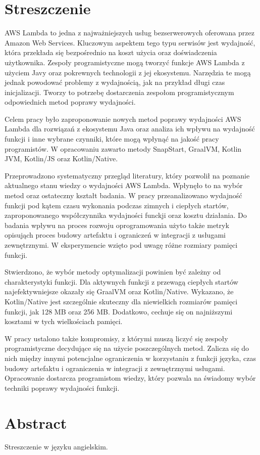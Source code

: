\section*{Streszczenie}

AWS Lambda to jedna z najważniejszych usług bezserwerowych oferowana przez Amazon Web Services.
Kluczowym aspektem tego typu serwisów jest wydajność, która przekłada się bezpośrednio na koszt użycia oraz doświadczenia użytkownika.
Zespoły programistyczne mogą tworzyć funkcje AWS Lambda z użyciem Javy oraz pokrewnych technologii z jej ekosystemu.
Narzędzia te mogą jednak powodować problemy z wydajnością, jak na przykład długi czas inicjalizacji.
Tworzy to potrzebę dostarczenia zespołom programistycznym odpowiednich metod poprawy wydajności.

Celem pracy było zaproponowanie nowych metod poprawy wydajności AWS Lambda dla rozwiązań z ekosystemu Java oraz analiza ich wpływu na wydajność funkcji i inne wybrane czynniki, które mogą wpłynąć na jakość pracy programistów.
W opracowaniu zawarto metody SnapStart, GraalVM, Kotlin JVM, Kotlin/JS oraz Kotlin/Native.

Przeprowadzono systematyczny przegląd literatury, który pozwolił na poznanie aktualnego stanu wiedzy o wydajności AWS Lambda.
Wpłynęło to na wybór metod oraz ostateczny kształt badania.
W pracy przeanalizowano wydajność funkcji pod kątem czasu wykonania podczas zimnych i ciepłych startów, zaproponowanego współczynnika wydajności funckji oraz kosztu działania.
Do badania wpływu na proces rozwoju oprogramowania użyto także metryk opisująch proces budowy artefaktu i ograniczeń w integracji z usługami zewnętrznymi.
W eksperymencie wzięto pod uwagę różne rozmiary pamięci funkcji.

Stwierdzono, że wybór metody optymalizacji powinien być zależny od charakterystyki funkcji.
Dla aktywnych funkcji z przewagą ciepłych startów najefektywniejsze okazały się GraalVM oraz Kotlin/Native.
Wykazano, że Kotlin/Native jest szczególnie skuteczny dla niewielkich rozmiarów pamięci funkcji, jak 128 MB oraz 256 MB.
Dodatkowo, cechuje się on najniższymi kosztami w tych wielkościach pamięci.

W pracy ustalono także kompromisy, z którymi muszą liczyć się zespoły programistyczne decydujące się na użycie poszczególnych metod.
Zalicza się do nich między innymi potencjalne ograniczenia w korzystaniu z funkcji języka, czas budowy artefaktu i ograniczenia w integracji z zewnętrznymi usługami.
Opracowanie dostarcza programistom wiedzy, który pozwala na świadomy wybór techniki poprawy wydajności funkcji.

\section*{Abstract}

Streszczenie  w języku angielskim.